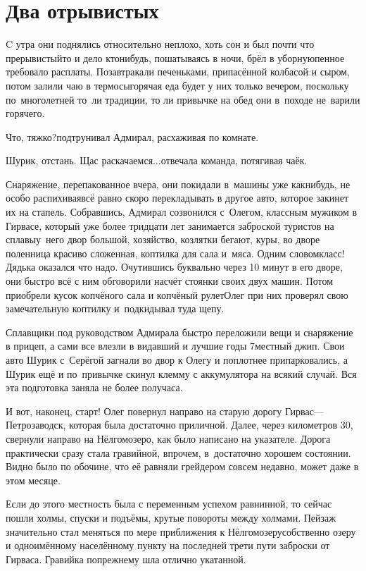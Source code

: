 \chapter{Два отрывистых}
\vepsianrose

C утра они поднялись относительно неплохо, хоть сон и был почти что прерывистый\mdash то и дело кто\sdash нибудь, пошатываясь в ночи, брёл в уборную\mdash пенное требовало расплаты. Позавтракали печеньками, припасённой колбасой и сыром, потом залили чаю в термосы\mdash горячая еда будет у них только вечером, поскольку по~многолетней то~ли традиции, то ли привычке на обед они в~походе не~варили горячего.

\diagdash Что, тяжко?\mdash подтрунивал Адмирал, расхаживая по комнате.

\diagdash Шурик, отстань. Щас раскачаемся$\ldots$\mdash отвечала команда, потягивая чаёк.

Снаряжение, перепакованное вчера, они покидали в~машины уже как\sdash нибудь, не особо распихивая\mdash всё равно скоро перекладывать в другое авто, которое закинет их на стапель. Собравшись, Адмирал созвонился с~Олегом, классным мужиком в Гирвасе, который уже более тридцати лет занимается заброской туристов на сплавы\mdash у~него двор большой, хозяйство, козлятки бегают, куры, во дворе поленница красиво сложенная, коптилка для сала и~мяса. Одним словом\mdash класс! Дядька оказался что надо. Очутившись буквально через 10 минут в его дворе, они быстро всё с ним обговорили насчёт стоянки своих двух машин. Потом приобрели кусок копчёного сала и копчёный рулет\mdash Олег при них проверял свою замечательную коптилку и~подкидывал туда щепу.

Сплавщики под руководством Адмирала быстро переложили вещи и снаряжение в прицеп, а сами все влезли в видавший и лучшие годы 7\sdash местный джип. Свои авто Шурик с~Серёгой загнали во двор к Олегу и поплотнее припарковались, а Шурик ещё и по~привычке скинул клемму с аккумулятора на всякий случай. Вся эта подготовка заняла не более получаса.

И вот, наконец, старт! Олег повернул направо на старую дорогу Гирвас\thinspace\nobreakdash---\thinspace  Петрозаводск, которая была достаточно приличной. Далее, через километров 30, свернули направо на Нёлгомозеро, как было написано на указателе. Дорога практически сразу стала гравийной, впрочем, в~достаточно хорошем состоянии. Видно было по обочине, что её равняли грейдером совсем недавно, может даже в этом месяце.

Если до этого местность была с переменным успехом равнинной, то сейчас пошли холмы, спуски и подъёмы, крутые повороты между холмами. Пейзаж значительно стал меняться по мере приближения к Нёлгомозеру\mdash собственно озеру и одноимённому населённому пункту на последней трети пути заброски от Гирваса. Гравийка по\sdash прежнему шла отлично укатанной.

